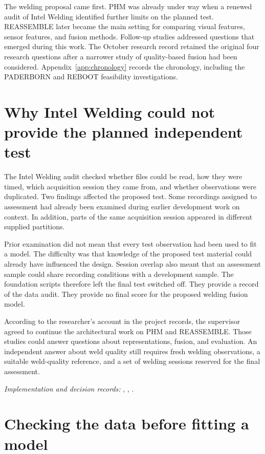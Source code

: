 The welding proposal came first. PHM was already under way when a renewed audit of Intel
Welding identified further limits on the planned test. REASSEMBLE later became the main
setting for comparing visual features, sensor features, and fusion methods. Follow-up
studies addressed questions that emerged during this work. The October research record
retained the original four research questions after a narrower study of quality-based
fusion had been considered. Appendix~\ref{app:chronology} records the chronology,
including the PADERBORN and REBOOT feasibility investigations.

\section{Why Intel Welding could not provide the planned independent test}
\label{sec:ch4-welding}

The Intel Welding audit checked whether files could be read, how they were timed, which
acquisition session they came from, and whether observations were duplicated. Two
findings affected the proposed test. Some recordings assigned to assessment had already
been examined during earlier development work on context. In addition, parts of the same
acquisition session appeared in different supplied partitions.

Prior examination did not mean that every test observation had been used to fit a model.
The difficulty was that knowledge of the proposed test material could already have
influenced the design. Session overlap also meant that an assessment sample could share
recording conditions with a development sample. The foundation scripts therefore left
the final test switched off. They provide a record of the data audit. They provide no
final score for the proposed welding fusion model.

According to the researcher’s account in the project records, the supervisor agreed to
continue the architectural work on PHM and REASSEMBLE. Those studies could answer
questions about representations, fusion, and evaluation. An independent answer about
weld quality still requires fresh welding observations, a suitable weld-quality
reference, and a set of welding sessions reserved for the final assessment.

\noindent\textit{Implementation and decision records:}
, ,
.

\section{Checking the data before fitting a model}
\label{sec:ch4-admission}

